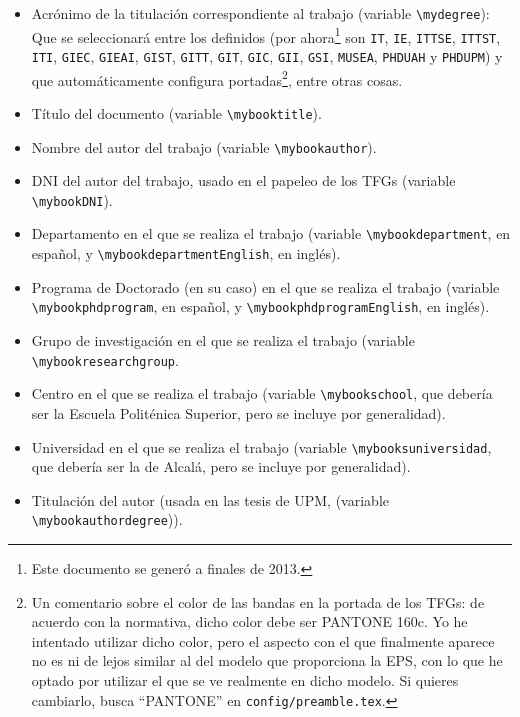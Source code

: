 \begin{itemize} 
\item Acrónimo de la titulación correspondiente al trabajo (variable
  \texttt{\textbackslash{}mydegree}): Que se seleccionará entre los
  definidos (por ahora\footnote{Este documento se generó a finales de
    2013.} son \texttt{IT}, \texttt{IE}, \texttt{ITTSE}, \texttt{ITTST},
  \texttt{ITI}, \texttt{GIEC}, \texttt{GIEAI}, \texttt{GIST},
  \texttt{GITT}, \texttt{GIT}, \texttt{GIC}, \texttt{GII}, \texttt{GSI},
  \texttt{MUSEA}, \texttt{PHDUAH} y \texttt{PHDUPM}) y que
  automáticamente configura portadas\footnote{Un comentario sobre el
    color de las bandas en la portada de los TFGs: de acuerdo con la
    normativa, dicho color debe ser PANTONE 160c. Yo he intentado
    utilizar dicho color, pero el aspecto con el que finalmente aparece
    no es ni de lejos similar al del modelo que proporciona la EPS, con
    lo que he optado por utilizar el que se ve realmente en dicho
    modelo. Si quieres cambiarlo, busca ``PANTONE'' en \texttt{config/preamble.tex}.}, entre otras cosas.
\item Título del documento (variable \texttt{\textbackslash{}mybooktitle}).
\item Nombre del autor del trabajo (variable \texttt{\textbackslash{}mybookauthor}).
\item DNI del autor del trabajo, usado en el papeleo de los TFGs (variable \texttt{\textbackslash{}mybookDNI}).
\item Departamento en el que se realiza el trabajo (variable
  \texttt{\textbackslash{}mybookdepartment}, en español, y \texttt{\textbackslash{}mybookdepartmentEnglish}, en inglés).
\item Programa de Doctorado (en su caso) en el que se realiza el trabajo (variable
  \texttt{\textbackslash{}mybookphdprogram}, en español, y
  \texttt{\textbackslash{}mybookphdprogramEnglish}, en inglés). 
\item Grupo de investigación en el que se realiza el trabajo (variable
  \texttt{\textbackslash{}mybookresearchgroup}.
\item Centro en el que se realiza el trabajo (variable \texttt{\textbackslash{}mybookschool}, que debería ser la Escuela Politénica Superior, pero se incluye por generalidad).
\item Universidad en el que se realiza el trabajo (variable \texttt{\textbackslash{}mybooksuniversidad}, que debería ser la de Alcalá, pero se incluye por generalidad).
\item Titulación del autor (usada en las tesis de UPM, (variable \texttt{\textbackslash{}mybookauthordegree})).

\end{itemize}
